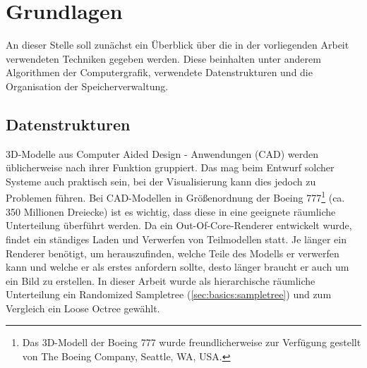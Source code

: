 \chapter{Grundlagen}
\label{chap:basics}
%
%
%
An dieser Stelle soll zunächst ein Überblick über die in der vorliegenden Arbeit verwendeten Techniken gegeben werden. Diese beinhalten unter anderem Algorithmen der Computergrafik, verwendete Datenstrukturen und die Organisation der Speicherverwaltung.

\section{Datenstrukturen}
\label{sec:basics:datenstrukturen}
3D-Modelle aus Computer Aided Design - Anwendungen (CAD) werden üblicherweise nach ihrer Funktion gruppiert. Das mag beim Entwurf solcher Systeme auch praktisch sein, bei der Visualisierung kann dies jedoch zu Problemen führen. Bei CAD-Modellen in Größenordnung der Boeing 777\footnote{%
Das 3D-Modell der Boeing 777 wurde freundlicherweise zur Verfügung gestellt von The Boeing Company, Seattle, WA, USA.} (ca. 350 Millionen Dreiecke) ist es wichtig, dass diese in eine geeignete räumliche Unterteilung überführt werden. Da ein Out-Of-Core-Renderer entwickelt wurde, findet ein ständiges Laden und Verwerfen von Teilmodellen statt. Je länger ein Renderer benötigt, um herauszufinden, welche Teile des Modells er verwerfen kann und welche er als erstes anfordern sollte, desto länger braucht er auch um ein Bild zu erstellen. In dieser Arbeit wurde als hierarchische räumliche Unterteilung ein Randomized Sampletree (\ref{sec:basics:sampletree}) und zum Vergleich ein Loose Octree gewählt.

